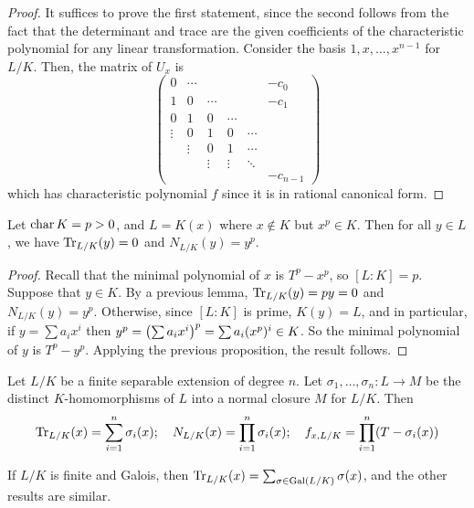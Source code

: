\begin{proof}
	It suffices to prove the first statement, since the second follows from the fact that the determinant and trace are the given coefficients of the characteristic polynomial for any linear transformation.
	Consider the basis \( 1, x, \dots, x^{n-1} \) for \( L / K \).
	Then, the matrix of \( U_x \) is
	\[ \begin{pmatrix}
		0 & \cdots & & & & -c_0 \\
		1 & 0 & \cdots & & & -c_1 \\
		0 & 1 & 0 & \cdots \\
		\vdots & 0 & 1 & 0 & \cdots \\
		& \vdots & 0 & 1 & \cdots \\
		& & \vdots & \vdots & \ddots \\
		& & & & & -c_{n-1}
	\end{pmatrix} \]
	which has characteristic polynomial \( f \) since it is in rational canonical form.
\end{proof}
\begin{corollary}
	Let \( \operatorname{char} K = p > 0 \), and \( L = K(x) \) where \( x \not\in K \) but \( x^p \in K \).
	Then for all \( y \in L \), we have \( \Tr_{L/K}(y) = 0 \) and \( N_{L/K}(y) = y^p \).
\end{corollary}
\begin{proof}
	Recall that the minimal polynomial of \( x \) is \( T^p - x^p \), so \( [L : K] = p \).
	Suppose that \( y \in K \).
	By a previous lemma, \( \Tr_{L/K}(y) = py = 0 \) and \( N_{L/K}(y) = y^p \).
	Otherwise, since \( [L:K] \) is prime, \( K(y) = L \), and in particular, if \( y = \sum a_i x^i \) then \( y^p = \qty(\sum a_i x^i)^p = \sum a_i (x^p)^i \in K \).
	So the minimal polynomial of \( y \) is \( T^p - y^p \).
	Applying the previous proposition, the result follows.
\end{proof}
\begin{proposition}
	Let \( L / K \) be a finite separable extension of degree \( n \).
	Let \( \sigma_1, \dots, \sigma_n \colon L \to M \) be the distinct \( K \)-homomorphisms of \( L \) into a normal closure \( M \) for \( L / K \).
	Then
	\[ \Tr_{L/K}(x) = \sum_{i=1}^n \sigma_i(x); \quad N_{L/K}(x) = \prod_{i=1}^n \sigma_i(x);\quad f_{x,L/K} = \prod_{i=1}^n (T - \sigma_i(x)) \]
\end{proposition}
\begin{remark}
	If \( L / K \) is finite and Galois, then \( \Tr_{L/K}(x) = \sum_{\sigma \in \operatorname{Gal}(L/K)} \sigma(x) \), and the other results are similar.
\end{remark}
